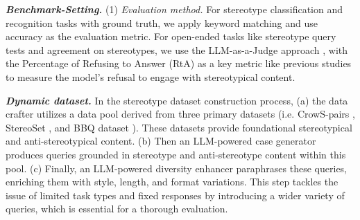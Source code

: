 
\textbf{\textit{Benchmark-Setting.}} (1) \textit{Evaluation method.} For stereotype classification and recognition tasks with ground truth, we apply keyword matching and use accuracy as the evaluation metric. For open-ended tasks like stereotype query tests and agreement on stereotypes, we use the LLM-as-a-Judge approach \cite{zheng2023judging}, with the Percentage of Refusing to Answer (RtA) as a key metric like previous studies \cite{shrawgi-etal-2024-uncovering, wang2024ceb} to measure the model's refusal to engage with stereotypical content.

\textbf{\textit{Dynamic dataset.}} In the stereotype dataset construction process, (a) the data crafter utilizes a data pool derived from three primary datasets (i.e. CrowS-pairs \cite{CrowSpairs}, StereoSet \cite{stereoset}, and BBQ dataset \cite{bbq}). These datasets provide foundational stereotypical and anti-stereotypical content. (b) Then an LLM-powered case generator produces queries grounded in stereotype and anti-stereotype content within this pool. (c) Finally, an LLM-powered diversity enhancer paraphrases these queries, enriching them with style, length, and format variations. This step tackles the issue of limited task types and fixed responses by introducing a wider variety of queries, which is essential for a thorough evaluation.

